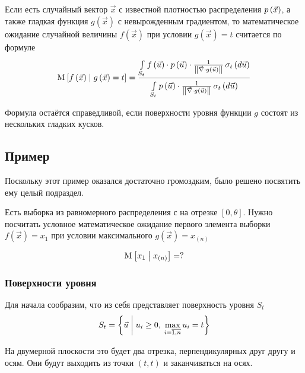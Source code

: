 \begin{theorem}
  \label{conditionalExpectationDefinition}
  Если есть случайный вектор $\vec{x}$ с известной плотностью распределения
  $\pdf{\vec{x}}$, а также гладкая функция $g\left( \vec{x} \right)$
  с невырожденным градиентом, то математическое ожидание случайной величины
  $f\left( \vec{x} \right)$ при условии $g\left( \vec{x} \right) = t$
  считается по формуле
  $$\Mean{f\left( \vec{x} \right) \mcond g\left( \vec{x} \right) = t}
      = \frac{\integrall{S_t}{\sigma_{t}\left(d\vec{u} \right)}{
      f\left( \vec{u} \right) \cdot \pdf{\vec{u}} \cdot \frac{1}{
      \left\| \vec{\nabla} \cdot g\left( \vec{u} \right) \right\|}}}
      {\integrall{S_t}{\sigma_{t}\left(d\vec{u} \right)}{
      \pdf{\vec{u}} \cdot \frac{1}{
    \left\| \vec{\nabla}
        \cdot g\left( \vec{u} \right) \right\|}}}$$
\end{theorem}

\begin{remark}
  Формула остаётся справедливой,
  если поверхности уровня функции $g$ состоят из нескольких гладких кусков.
\end{remark}

\subsection{Пример}
Поскольку этот пример оказался достаточно громоздким,
было решено посвятить ему целый подраздел.

Есть выборка \xsample из равномерного распределения
с на отрезке $\left[ 0, \theta \right]$.
Нужно посчитать условное математическое ожидание
первого элемента выборки $f\left( \vec{x} \right) = x_1$
при условии максимального $g\left( \vec{x} \right) = x_{\left( n \right)}$

$$\Mean{x_1 \mcond x_{\left( n \right)}} = ?$$

\subsubsection{Поверхности уровня}
Для начала сообразим, что из себя представляет поверхность уровня
$S_t$
$$S_t = \left\{ \vec{u} \mcond
  u_i \ge 0,\; \max_{i= \overline{1,n}} u_i = t \right\}$$

На двумерной плоскости это будет два отрезка,
перпендикулярных друг другу и осям.
Они будут выходить из точки $\left( t, t \right)$
и заканчиваться на осях.


